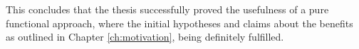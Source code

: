 \medskip

This concludes that the thesis successfully proved the usefulness of a pure functional approach, where the initial hypotheses and claims about the benefits as outlined in Chapter \ref{ch:motivation}, being definitely fulfilled.
 
%





%




